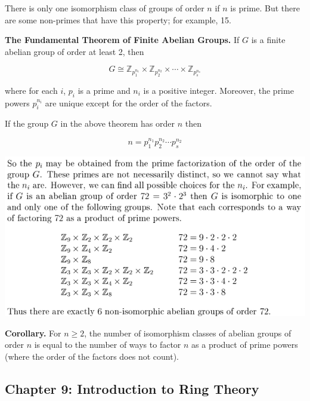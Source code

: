 \documentclass{article}
\begin{document}
There is only one isomorphism class of groups of order \(n\) if \(n\) is prime. But there are some non-primes that have this property; for example, 15.

\textbf{The Fundamental Theorem of Finite Abelian Groups.} If \(G\) is a finite abelian group of order at least 2, then 

\[
G \cong \mathbb{Z}_{p_1^{n_1}} \times \mathbb{Z}_{p_2^{n_2}} \times \cdots \times \mathbb{Z}_{p_s^{n_s}} 
\]

where for each \(i\), \(p_i\) is a prime and \(n_i\) is a positive integer. Moreover, the prime powers \(p_i^{n_i}\) are unique except for the order of the factors.

If the group \(G\) in the above theorem has order \(n\) then

\[
n = p_1^{n_1}p_2^{n_2} \cdots p_s^{n_2}
\]

\includegraphics[scale=0.45]{isomorphism_groups_order2}

\textbf{Corollary.} For \(n \geq 2\), the number of isomorphism classes of abelian groups of order \(n\) is equal to the number of ways to factor \(n\) as a product of prime powers (where the order of the factors does not count).


\pagebreak
\subsection{Chapter 9: Introduction to Ring Theory}
\end{document}
